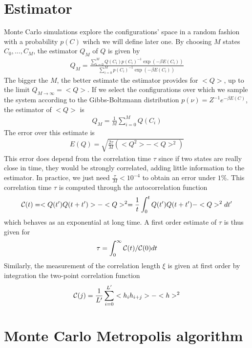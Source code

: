     \section{Estimator}

Monte Carlo simulations explore the configurations' space in a random fashion \cite{newman_monte_1999} with a probability $p(C)$ wihch we will define later one. By choosing $M$ states ${C_0,...,C_M}$, the estimator $Q_M$ of $Q$ is given by
\begin{align}
    Q_M = \frac{\sum_{i=0}^M Q(C_i) p(C_i)^{-1} \exp(-\beta E(C_i))}{\sum_{i=0}^M  p(C_i)^{-1} \exp(-\beta E(C_i))}
\end{align}
The bigger the $M$, the better estimate the estimator provides for $<Q>$, up to the limit $Q_{M\to \infty} = <Q>$. If we select the configurations over which we sample the system according to the Gibbs-Boltzmann distribution $p(\nu) = Z^{-1} e^{-\beta E(C)}$, the estimator of $<Q>$ is
\begin{align}
    Q_M = \frac{1}{M} \sum_{i=0}^M Q(C_i)
\end{align}
The error over this estimate is
\begin{align}
	E(Q) = \sqrt{\frac{2 \tau}{M} (<Q^2>-<Q>^2)} 
\end{align}
This error does depend from the correlation time $\tau$ since if two states are really close in time, they would be strongly correlated, adding little information to the estimator. In practice, we just need $\frac{\tau}{M} \less 10^{-4}$ to obtain an error under $1\%$. This correlation time $\tau$ is computed through the autocorrelation function
\begin{align}
    \mathcal{C}(t) = <Q(t')Q(t+t')>- <Q>^2 = \frac{1}{t}\int_0^t Q(t')Q(t+t')-<Q>^2 dt' 
\end{align}
which behaves as an exponential at long time\cite{wansleben_monte_1991}. A first order estimate of $\tau$ is thus given for
\begin{align}
	\tau = \int_0^{\infty} \mathcal{C}(t)/\mathcal{C}(0) dt
	\label{tau_cor}
\end{align}
Similarly, the measurement of the correlation length $\xi$ is given at first order by integration the two-point correlation function
\begin{align}
\mathcal{C}(j) = \frac{1}{L'} \sum_{i=0}^{L'} <h_i h_{i+j}>-<h>^2 
\end{align}

    \section{Monte Carlo Metropolis algorithm}

